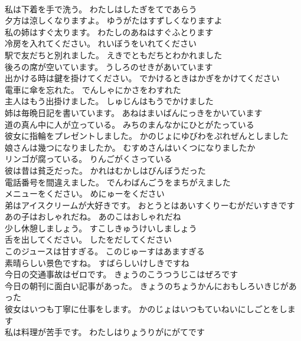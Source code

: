 \documentclass[8pt]{extreport}
\begin{document}
\begin{CJK}{UTF8}{min}
\\	私は下着を手で洗う。	わたしはしたぎをてであらう 
\\	夕方は涼しくなりますよ。	ゆうがたはすずしくなりますよ 
\\	私の姉はすぐ太ります。	わたしのあねはすぐふとります 
\\	冷房を入れてください。	れいぼうをいれてください 
\\	駅で友だちと別れました。	えきでともだちとわかれました 
\\	後ろの席が空いています。	うしろのせきがあいています 
\\	出かける時は鍵を掛けてください。	でかけるときはかぎをかけてください 
\\	電車に傘を忘れた。	でんしゃにかさをわすれた 
\\	主人はもう出掛けました。	しゅじんはもうでかけました 
\\	姉は毎晩日記を書いています。	あねはまいばんにっきをかいています 
\\	道の真ん中に人が立っている。	みちのまんなかにひとがたっている 
\\	彼女に指輪をプレゼントしました。	かのじょにゆびわをぷれぜんとしました 
\\	娘さんは幾つになりましたか。	むすめさんはいくつになりましたか 
\\	リンゴが腐っている。	りんごがくさっている 
\\	彼は昔は貧乏だった。	かれはむかしはびんぼうだった 
\\	電話番号を間違えました。	でんわばんごうをまちがえました 
\\	メニューをください。	めにゅーをください 
\\	弟はアイスクリームが大好きです。	おとうとはあいすくりーむがだいすきです 
\\	あの子はおしゃれだね。	あのこはおしゃれだね 
\\	少し休憩しましょう。	すこしきゅうけいしましょう 
\\	舌を出してください。	したをだしてください 
\\	このジュースは甘すぎる。	このじゅーすはあますぎる 
\\	素晴らしい景色ですね。	すばらしいけしきですね 
\\	今日の交通事故はゼロです。	きょうのこうつうじこはぜろです 
\\	今日の朝刊に面白い記事があった。	きょうのちょうかんにおもしろいきじがあった 
\\	彼女はいつも丁寧に仕事をします。	かのじょはいつもていねいにしごとをします 
\\	私は料理が苦手です。	わたしはりょうりがにがてです 

\end{CJK}
\end{document}
